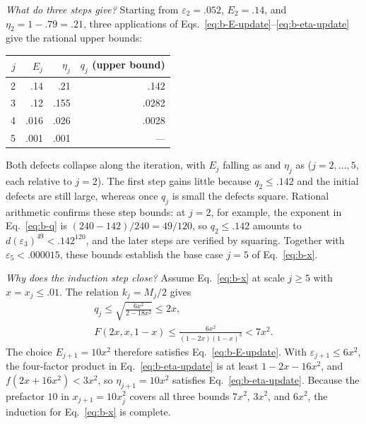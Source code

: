 \documentclass[aps,prl,reprint,amsmath,amssymb,nofootinbib,raggedbottom]{revtex4-2}
\begin{document}
\emph{What do three steps give?} Starting from $\varepsilon_2=.052$,
$E_2=.14$, and $\eta_2=1-.79=.21$, three applications of
Eqs.~\eqref{eq:b-E-update}--\eqref{eq:b-eta-update} give the rational upper
bounds:
\begin{center}
\begin{tabular}{@{}rrrr@{}}
\toprule
$j$ & $E_j$ & $\eta_j$ & $q_j$ (upper bound)\\
\midrule
2 & .14 & .21 & .142\\
3 & .12 & .155 & .0282\\
4 & .016 & .026 & .0028\\
5 & .001 & .001 & ---\\
\bottomrule
\end{tabular}
\end{center}
Both defects collapse along the iteration, with $E_j$ falling as
 and $\eta_j$ as 
($j=2,\dots,5$, each relative to $j=2$). The first step gains little because
$q_2\le.142$ and the initial defects are still large, whereas once $q_j$ is
small the defects square. Rational arithmetic confirms these step bounds: at
$j=2$, for example, the exponent in Eq.~\eqref{eq:b-q} is
$(240-142)/240=49/120$, so $q_2\le.142$ amounts to
$d(\varepsilon_3)^{49}<.142^{120}$, and the later steps are verified by
squaring. Together with $\varepsilon_5<.000015$, these bounds establish the
base case $j=5$ of Eq.~\eqref{eq:b-x}.

\emph{Why does the induction step close?} Assume Eq.~\eqref{eq:b-x} at scale
$j\ge5$ with $x=x_j\le.01$. The relation $k_j=M_j/2$ gives
\begin{equation}
 \begin{gathered}
 q_j\le\sqrt{\frac{6x^2}{2-18x^2}}\le2x,\\
 F(2x,x,1-x)\le\frac{6x^2}{(1-2x)(1-x)^3}<7x^2.
 \end{gathered}
 \label{eq:b-x-e}
\end{equation}
The choice $E_{j+1}=10x^2$ therefore satisfies Eq.~\eqref{eq:b-E-update}. With
$\varepsilon_{j+1}\le6x^2$, the four-factor product in
Eq.~\eqref{eq:b-eta-update} is at least $1-2x-16x^2$, and
$f(2x+16x^2)<3x^2$, so $\eta_{j+1}=10x^2$ satisfies
Eq.~\eqref{eq:b-eta-update}. Because the prefactor $10$ in $x_{j+1}=10x_j^2$
covers all three bounds $7x^2$, $3x^2$, and $6x^2$, the induction for
Eq.~\eqref{eq:b-x} is complete.
\end{document}
